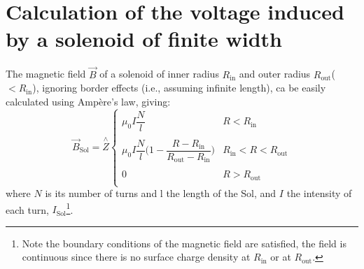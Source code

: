 \documentclass[a4paper,12pt,oneside]{book}
\begin{document}


%




\appendix %




\chapter{Calculation of the voltage induced by a solenoid of finite width}
\label{appendix_loop voltage}
The magnetic field $\vec{B}$ of a solenoid of inner radius $R_\text{in}$ and outer radius $R_\text{out}$($<R_\text{in}$), ignoring border effects (i.e., assuming infinite length), ca be easily calculated using Ampère's law, giving:
%
\begin{equation}
\vec{B}_\text{Sol}= \stackrel{\wedge}{Z}
\left\{
	\begin{array}{cc}
	\mu_0 I \dfrac{N}{l} & R < R_\text{in} \\
	\\
	 \mu_0 I \dfrac{N}{l} \Big(1- \dfrac{R-R_\text{in}}{R_\text{out}-R_\text{in}} \Big)  & R_\text{in}<R<R_\text{out} \\ 
	 \\
	0 & R> R_\text{out} \\
	\end{array}
\right.
\end{equation}
where $N$ is its number of turns and l the length of the Sol, and $I$ the intensity of each turn, $I_\text{Sol}$\footnote{Note the boundary conditions of the magnetic field are satisfied, the field is continuous since there is no surface charge density at $R_\text{in}$ or at $R_\text{out}$.}.
\end{document}
